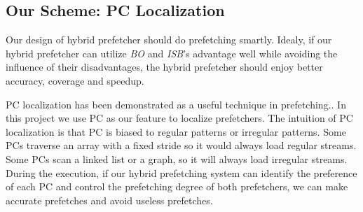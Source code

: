 \subsection{Our Scheme: PC Localization}
  \label{sec:goal}
  Our design of hybrid prefetcher should do prefetching smartly. Idealy, if our hybrid prefetcher can utilize \emph{BO} and \emph{ISB}'s advantage well while avoiding the influence of their disadvantages, the hybrid prefetcher should enjoy better accuracy, coverage and speedup. \par
  PC localization has been demonstrated as a useful technique in prefetching.\cite{isbpaper, ghbpaper, shippaper}. In this project we use PC as our feature to localize prefetchers. The intuition of PC localization is that PC is biased to regular patterns or irregular patterns.
  Some PCs traverse an array with a fixed stride so it would always load regular streams. Some PCs scan a linked list or a graph, so it will always load irregular streams.
  During the execution, if our hybrid prefetching system can identify the preference of each PC and control the prefetching degree of both prefetchers, we can make accurate prefetches and avoid useless prefetches. \par
